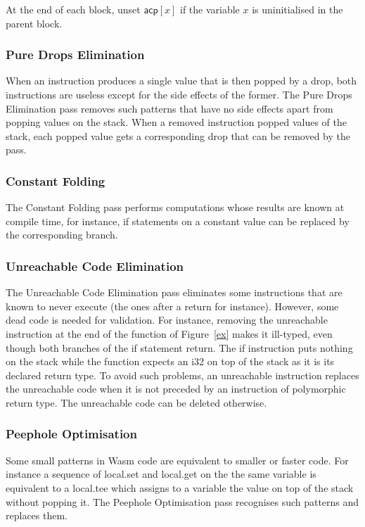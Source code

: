 \documentclass[a4paper,11pt]{article}
\begin{document}
At the end of each block, unset $\textsf{acp}[x]$ if the variable $x$ is
uninitialised in the parent block.
\subsubsection{Pure Drops Elimination}
When an instruction produces a single value that is then popped by a
\textsf{drop}, both instructions are useless except for the side effects of the
former. The Pure Drops Elimination pass removes such patterns that have no side
effects apart from popping values on the stack. When a removed instruction
popped values of the stack, each popped value gets a corresponding \textsf{drop}
that can be removed by the pass.

\subsubsection{Constant Folding}
The Constant Folding pass performs computations whose results are known at
compile time, for instance, if statements on a constant value can be replaced
by the corresponding branch.

\subsubsection{Unreachable Code Elimination}
The Unreachable Code Elimination pass eliminates some instructions that are
known to never execute (the ones after a \textsf{return} for instance). However,
some dead code is needed for validation. For instance, removing the
\textsf{unreachable} instruction at the end of the function of Figure~\ref{ex}
makes it ill-typed, even though both branches of the if statement return. The
\textsf{if} instruction puts nothing on the stack while the function expects an
\textsf{i32} on top of the stack as it is its declared return type. To avoid
such problems, an \textsf{unreachable} instruction replaces the unreachable code
when it is not preceded by an instruction of polymorphic return type. The
unreachable code can be deleted otherwise.

\subsubsection{Peephole Optimisation}
Some small patterns in Wasm code are equivalent to smaller or faster code. For
instance a sequence of \textsf{local.set} and \textsf{local.get} on the the same
variable is equivalent to a \textsf{local.tee} which assigns to a variable the
value on top of the stack without popping it. The Peephole Optimisation pass
recognises such patterns and replaces them.
\end{document}
